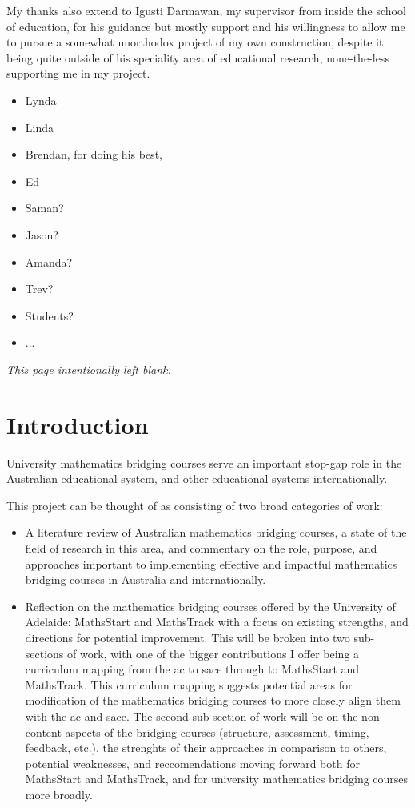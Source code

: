 \documentclass[twoside,12pt,a4paper]{report}
\makeatletter
\newcommand*{\intentionallyblankpage}{
  \vspace*{\fill}
  {\centering \textit{This page intentionally left blank.} \par}
  \vspace{\fill}}
\renewcommand*{\cleardoublepage}{\clearpage\if@twoside \ifodd\c@page\else
  \intentionallyblankpage
  \newpage
  \if@twocolumn\hbox{}\newpage\fi\fi\fi}
\makeatother
\begin{document}
My thanks also extend to Igusti Darmawan, my supervisor from inside the school of education, for his guidance but mostly support and his willingness to allow me to pursue a somewhat unorthodox project of my own construction, despite it being quite outside of his speciality area of educational research, none-the-less supporting me in my project.

\begin{itemize}
	\item Lynda 
	\item Linda
	\item Brendan, for doing his best,
	\item Ed 
	\item Saman?
	\item Jason?
	\item Amanda?
	\item Trev?
	\item Students?
	\item ...
\end{itemize}





\cleardoublepage
\chapter{Introduction}
\label{chap:intro}

\glsresetall

University mathematics bridging courses serve an important stop-gap role in the Australian educational system, and other educational systems internationally.

This project can be thought of as consisting of two broad categories of work:
\begin{itemize}
	\item A literature review of Australian mathematics bridging courses, a state of the field of research in this area, and commentary on the role, purpose, and approaches important to implementing effective and impactful mathematics bridging courses in Australia and internationally.
	\item Reflection on the  mathematics bridging courses offered by the University of Adelaide: MathsStart and MathsTrack with a focus on existing strengths, and directions for potential improvement. This will be broken into two sub-sections of work, with one of the bigger contributions I offer being a curriculum mapping from the \gls{ac} to \gls{sace} through to MathsStart and MathsTrack. This curriculum mapping suggests potential areas for modification of the mathematics bridging courses to more closely align them with the \gls{ac} and \gls{sace}. The second sub-section of work will be on the non-content aspects of the bridging courses (structure, assessment, timing, feedback, etc.), the strenghts of their approaches in comparison to others, potential weaknesses, and reccomendations moving forward both for MathsStart and MathsTrack, and for university mathematics bridging courses more broadly.
\end{itemize}
\end{document}
